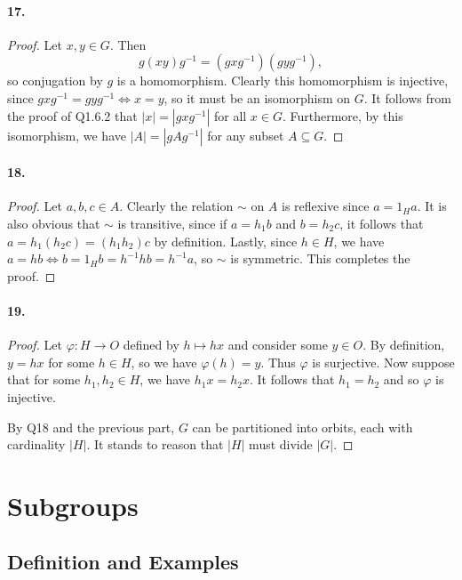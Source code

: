 \documentclass{article}
\begin{document}
\paragraph{17.}
\begin{proof}
  Let $x, y \in G$. Then \[
    g(xy)g^{-1} = (gxg^{-1})(gyg^{-1}),
  \] so conjugation by $g$ is a homomorphism. Clearly this homomorphism is
  injective, since $gxg^{-1} = gyg^{-1} \iff x = y$, so it must be an
  isomorphism on $G$. It follows from the proof of Q1.6.2 that $|x| =
  |gxg^{-1}|$ for all $x \in G$. Furthermore, by this isomorphism, we have
  $|A| = |gAg^{-1}|$ for any subset $A \subseteq G$.
\end{proof}

\paragraph{18.}
\begin{proof}
  Let $a, b, c \in A$. Clearly the relation $\sim$ on $A$ is reflexive since
  $a = 1_Ha$. It is also obvious that $\sim$ is transitive, since if $a = h_1b$
  and $b = h_2c$, it follows that $a = h_1(h_2c) = (h_1h_2)c$ by definition.
  Lastly, since $h \in H$, we have $a = hb \iff b = 1_Hb = h^{-1}hb = h^{-1}a$,
  so $\sim$ is symmetric. This completes the proof.
\end{proof}

\paragraph{19.}
\begin{proof}
  Let $\varphi: H \to O$ defined by $h \mapsto hx$ and consider some $y \in O$.
  By definition, $y = hx$ for some $h \in H$, so we have $\varphi(h) = y$. Thus
  $\varphi$ is surjective. Now suppose that for some $h_1, h_2 \in H$, we have
  $h_1x = h_2x$. It follows that $h_1 = h_2$ and so $\varphi$ is injective.

  By Q18 and the previous part, $G$ can be partitioned into orbits, each with
  cardinality $|H|$. It stands to reason that $|H|$ must divide $|G|$.
\end{proof}

\section{Subgroups}

\subsection{Definition and Examples}
\end{document}
